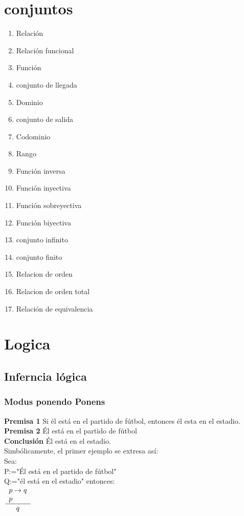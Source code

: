 \documentclass{book}
\numberwithin{equation}{section}
\theoremstyle{plain}  %
\begin{document}
\chapter{conjuntos}
    \begin{enumerate}
        \item Relación
        \item Relación funcional
        \item Función
        \item conjunto de llegada
        \item Dominio
        \item conjunto de salida
        \item Codominio 
        \item Rango
        \item Función inversa
        \item Función inyectiva 
        \item Función sobreyectiva 
        \item Función biyectiva 
        \item conjunto infinito 
        \item conjunto finito 
        \item Relacion de orden 
        \item Relacion de orden total 
        \item Relación de equivalencia 
    \end{enumerate}
\chapter{Logica}
\section{Inferncia lógica}
\subsection{Modus ponendo Ponens} 
\textbf{Premisa 1} Si él está en el partido de fútbol, entonces él esta en el estadio. \\ 
\textbf{Premisa 2} Él está en el partido de fútbol \\
\textbf{Conclusión} Él está en el estadio. \\
Simbólicamente, el primer ejemplo se extresa así: \\ 
Sea: \\ P:="Él está en el partido de fútbol" \\ 
Q:="él está en el estadio" 
entonces:  \\ 
$\frac{%
\begin{array}{l}
p\rightarrow q \\ 
p%
\end{array}
}{%
\begin{array}{l}
q%
\end{array}
}$
\end{document}
